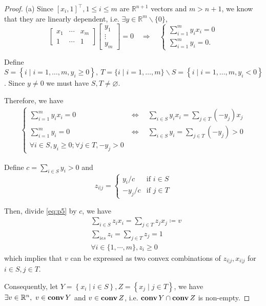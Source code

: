 \documentclass[11pt]{article}
\begin{document}
\begin{proof}
    (a) Since $\left[x_i, 1\right]^{\top}, 1 \leq i \leq m$ are $\mathbb{R}^{n+1}$ vectors and $m>n+1$, we know that they are linearly dependent, i.e. $\exists y \in \mathbb{R}^m \backslash\{0\}$,
    $$
    \left[\begin{array}{ccc}
    x_1 & \cdots & x_m \\
    1 & \cdots & 1
    \end{array}\right]\left[\begin{array}{c}
    y_1 \\
    \vdots \\
    y_m
    \end{array}\right]=0 
    \quad\Rightarrow\quad
    \begin{cases}
        \sum_{i=1}^m y_i x_i=0 \\
        \sum_{i=1}^m y_i=0 .
    \end{cases}
    $$
    
    Define $S=\left\{i\mid i = 1, \dots,  m, y_i \geq 0\right\},\ T=\{i\mid i=1, \dots, m\} \backslash S=\left\{i\mid i = 1, \dots,  m, y_i<0\right\}$. Since $y \neq 0$ we must have $S, T \neq \varnothing$. 
    
    Therefore, we have
    \begin{align}
        \begin{cases}  
            \sum_{i=1}^m y_i x_i=0 &\Leftrightarrow\quad \sum_{i \in S} y_i x_i=\sum_{j \in T}\left(-y_j\right) x_j\\
            \sum_{i=1}^m y_i=0 &\Leftrightarrow\quad \sum_{i \in S} y_i=\sum_{j \in T}\left(-y_j\right)>0 \\
            \forall i \in S, y_i \geq 0 ; \forall j \in T,-y_j>0
        \end{cases}
        \label{eq:p5}
    \end{align}
    
    Define $c=\sum_{i \in S} y_i>0$ and
    \[
    z_{i|j} = 
    \begin{cases}
        y_i / c & \text{if } i \in S\\
        -y_j / c & \text{if }  j \in T
    \end{cases}
    \]

    Then, divide \eqref{eq:p5} by $c$, we have
    \begin{align*}
        &\sum_{i \in S} z_i x_i=\sum_{j \in T} z_j x_j \coloneqq v\\
        &\sum_{i \epsilon s} z_i=\sum_{j \in T} z_j=1\\
        &\forall i \in\{1, \cdots, m\}, z_i \geq 0
    \end{align*}
    which implies that $v$ can be expressed as two convex combinations of $z_{i|j}, x_{i|j}$ for $i\in S, j\in T$.
    
    Consequently, let $Y=\left\{x_i\mid i \in S\right\}, Z=\left\{x_j\mid j \in T\right\}$, we have $\exists v \in \mathbb{R}^n, \ v\in\mathop {\textbf{conv}} Y$ and $v\in\mathop {\textbf{conv}}  Z$, i.e.
    $\mathop {\textbf{conv}} Y \cap \mathop {\textbf{conv}} Z$ is non-empty.
\end{proof}
\end{document}
